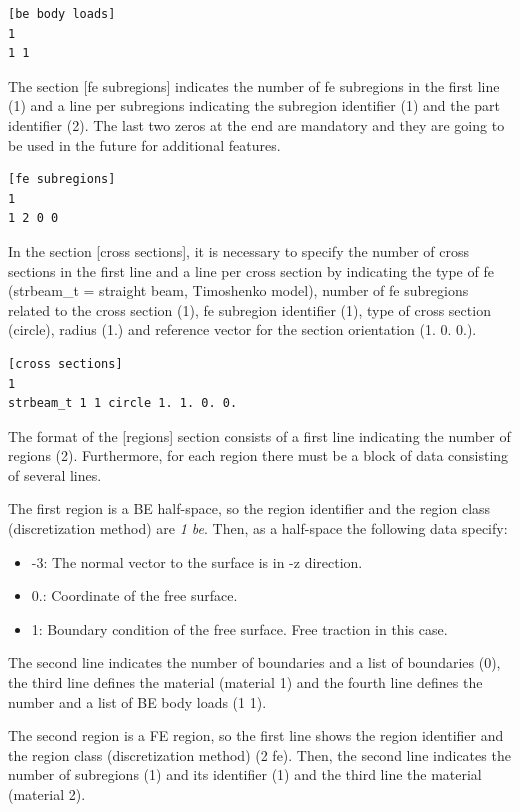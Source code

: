 \documentclass[a4]{article}
\begin{document}
\begin{Verbatim}
[be body loads]
1
1 1
\end{Verbatim}

The section [fe subregions] indicates the number of fe subregions in the first line (1) and a line per subregions indicating the subregion identifier (1) and the part identifier (2). The last two zeros at the end are mandatory and they are going to be used in the future for additional features.

\begin{Verbatim}
[fe subregions]
1
1 2 0 0
\end{Verbatim}

In the section [cross sections], it is necessary to specify the number of cross sections in the first line and a line per cross section by indicating the type of fe (strbeam\_t = straight beam, Timoshenko model), number of fe subregions related to the cross section (1), fe subregion identifier (1), type of cross section (circle), radius (1.) and reference vector for the section orientation (1. 0. 0.).

\begin{Verbatim}
[cross sections]
1
strbeam_t 1 1 circle 1. 1. 0. 0.
\end{Verbatim}

The format of the [regions] section consists of a first line indicating the number of regions (2). Furthermore, for each region there must be a block of data consisting of several lines. 

The first region is a BE half-space, so the region identifier and the region class (discretization method) are \emph{1 be}. Then, as a half-space the following data specify:

\begin{itemize}
	\item -3: The normal vector to the surface is in -z direction.
	\item 0.: Coordinate of the free surface.
	\item 1: Boundary condition of the free surface. Free traction in this case. 
\end{itemize}

The second line indicates the number of boundaries and a list of boundaries (0), the third line defines the material (material 1) and the fourth line defines the number and a list of BE body loads (1 1).

The second region is a FE region, so the first line shows the region identifier and the region class (discretization method) (2 fe). Then, the second line indicates the number of subregions (1) and its identifier (1) and the third line the material (material 2). 
\end{document}
